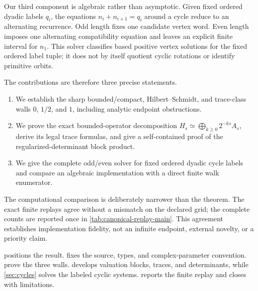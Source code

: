Our third component is algebraic rather than asymptotic.  Given fixed ordered
dyadic labels $q_i$, the equations $n_i+n_{i+1}=q_i$ around a cycle reduce to
an alternating recurrence.  Odd length fixes one candidate vertex word.
Even length imposes one alternating compatibility equation and leaves an
explicit finite interval for $n_1$.  This solver classifies based positive
vertex solutions for the fixed ordered label tuple; it does not by itself
quotient cyclic rotations or identify primitive orbits.

The contributions are therefore three precise statements.
\begin{enumerate}
  \item We establish the sharp bounded/compact, Hilbert--Schmidt, and
  trace-class walls $0$, $1/2$, and $1$, including analytic endpoint
  obstructions.
  \item We prove the exact bounded-operator decomposition
  $H_s\simeq\bigoplus_{k\ge0}2^{-ks}A_s$, derive its legal trace formulas,
  and give a self-contained proof of the regularized-determinant block
  product.
  \item We give the complete odd/even solver for fixed ordered dyadic cycle
  labels and compare an algebraic implementation with a direct finite walk
  enumerator.
\end{enumerate}

The computational comparison is deliberately narrower than the theorem.
The exact finite replays agree without a mismatch on the declared grid; the
complete counts are reported once in \cref{tab:canonical-replay-main}.  This
agreement establishes implementation fidelity, not an infinite endpoint,
external novelty, or a priority claim.

 positions the result.   fixes the source,
types, and complex-parameter convention.  
prove the three walls.   develops valuation blocks, traces,
and determinants, while \cref{sec:cycles} solves the labeled cyclic systems.
 reports the finite replay and closes with limitations.
